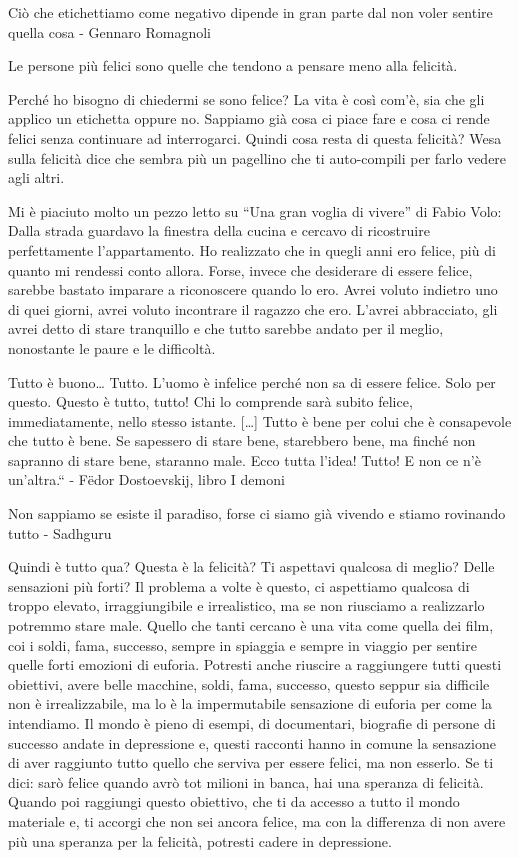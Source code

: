 \documentclass[12pt]{book} %
\begin{document}
Ciò che etichettiamo come negativo dipende in gran parte dal non voler sentire quella cosa - Gennaro Romagnoli

Le persone più felici sono quelle che tendono a pensare meno alla felicità.

Perché ho bisogno di chiedermi se sono felice? La vita è così com'è, sia che gli applico un etichetta oppure no. Sappiamo già cosa ci piace fare e cosa ci rende felici senza continuare ad interrogarci. Quindi cosa resta di questa felicità? Wesa sulla felicità dice che sembra più un pagellino che ti auto-compili per farlo vedere agli altri. 

Mi è piaciuto molto un pezzo letto su “Una gran voglia di vivere” di
Fabio Volo: Dalla strada guardavo la finestra della cucina e cercavo di ricostruire perfettamente
l'appartamento. Ho realizzato che in quegli anni ero felice, più di quanto mi rendessi conto
allora. Forse, invece che desiderare di essere felice, sarebbe bastato imparare a riconoscere quando lo ero. Avrei
voluto indietro uno di quei giorni, avrei voluto incontrare il ragazzo che ero. L'avrei
abbracciato, gli avrei detto di stare tranquillo e che tutto sarebbe andato per il meglio, nonostante le paure e le
difficoltà. 

Tutto è buono… Tutto. L'uomo è infelice perché non sa di essere felice. Solo per questo. Questo è tutto, tutto! Chi lo
comprende sarà subito felice, immediatamente, nello stesso istante. […] Tutto è bene per colui che è consapevole che
tutto è bene. Se sapessero di stare bene, starebbero bene, ma finché non sapranno di stare bene, staranno male. Ecco
tutta l'idea! Tutto! E non ce n'è un'altra.“ - Fëdor Dostoevskij, libro I demoni

Non sappiamo se esiste il paradiso, forse ci siamo già vivendo e stiamo rovinando tutto - Sadhguru

Quindi è tutto qua? Questa è la felicità? Ti aspettavi qualcosa di meglio? Delle sensazioni più forti? Il problema a volte è questo, ci aspettiamo qualcosa di troppo elevato, irraggiungibile e irrealistico, ma se non riusciamo a
realizzarlo potremmo stare male. Quello che tanti cercano è una vita come quella dei film, coi i soldi, fama, successo,
sempre in spiaggia e sempre in viaggio per sentire quelle forti emozioni di euforia. Potresti anche riuscire
a raggiungere tutti questi obiettivi, avere belle macchine, soldi, fama, successo, questo seppur sia difficile non è
irrealizzabile, ma lo è la impermutabile sensazione di euforia per come la intendiamo. Il mondo è pieno di esempi, di
documentari, biografie di persone di successo andate in depressione e, questi racconti hanno in comune la
sensazione di aver raggiunto tutto quello che serviva per essere felici, ma non esserlo. Se ti dici: sarò felice quando
avrò tot milioni in banca, hai una speranza di felicità. Quando poi raggiungi questo obiettivo, che ti da accesso a
tutto il mondo materiale e, ti accorgi che non sei ancora felice, ma con la differenza di non avere più una speranza per la felicità, potresti cadere in depressione.
\end{document}
